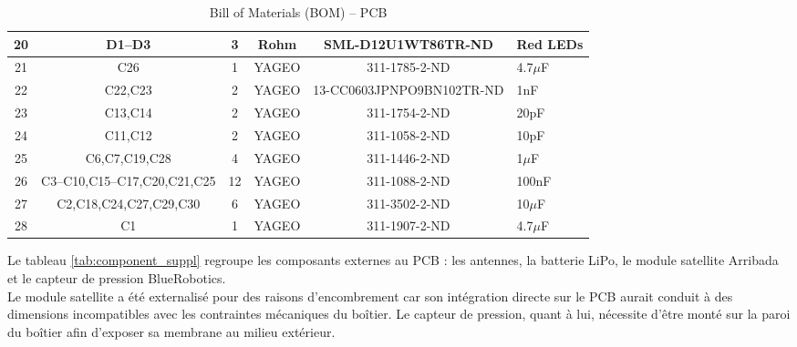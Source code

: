 \documentclass[12pt]{article}
\begin{document}
\begin{table}[h!]
\begin{tabularx}{\textwidth}{|c|c|c|c|c|X|}
20 & D1--D3 & 3 & Rohm & SML-D12U1WT86TR-ND & Red LEDs \\ \hline

21 & C26 & 1 & YAGEO & 311-1785-2-ND & 4.7$\mu$F \\ \hline
22 & C22,C23 & 2 & YAGEO & 13-CC0603JPNPO9BN102TR-ND & 1nF \\ \hline
23 & C13,C14 & 2 & YAGEO & 311-1754-2-ND & 20pF \\ \hline
24 & C11,C12 & 2 & YAGEO & 311-1058-2-ND & 10pF \\ \hline
25 & C6,C7,C19,C28 & 4 & YAGEO & 311-1446-2-ND & 1$\mu$F \\ \hline
26 & C3--C10,C15--C17,C20,C21,C25 & 12 & YAGEO & 311-1088-2-ND & 100nF \\ \hline
27 & C2,C18,C24,C27,C29,C30 & 6 & YAGEO & 311-3502-2-ND & 10$\mu$F \\ \hline
28 & C1 & 1 & YAGEO & 311-1907-2-ND & 4.7$\mu$F \\ \hline

\end{tabularx}

\caption{Bill of Materials (BOM) – PCB}
\label{tab:bom}
\end{table}

Le tableau \ref{tab:component_suppl} regroupe les composants externes au PCB : les antennes, la batterie LiPo, le module satellite Arribada et le capteur de pression BlueRobotics. \\
Le module satellite a été externalisé pour des raisons d'encombrement car son intégration directe sur le PCB aurait conduit à des dimensions incompatibles avec les contraintes mécaniques du boîtier. Le capteur de pression, quant à lui, nécessite d'être monté sur la paroi du boîtier afin d'exposer sa membrane au milieu extérieur.
\end{document}
